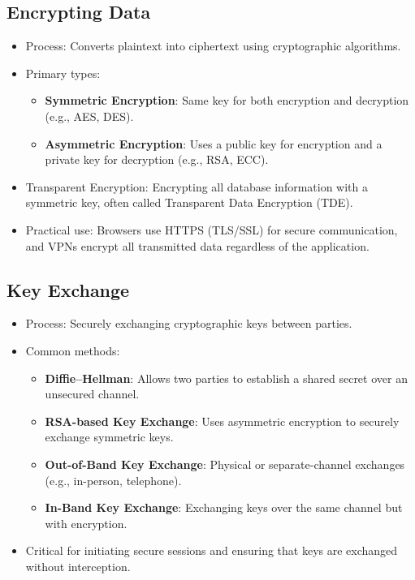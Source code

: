 \documentclass[11pt]{article}
\begin{document}
\subsection{Encrypting Data}
\label{sec:org29b72f5}
\begin{itemize}
\item Process: Converts plaintext into ciphertext using cryptographic algorithms.
\item Primary types:
\begin{itemize}
\item \textbf{Symmetric Encryption}: Same key for both encryption and decryption (e.g., AES, DES).
\item \textbf{Asymmetric Encryption}: Uses a public key for encryption and a private key for decryption (e.g., RSA, ECC).
\end{itemize}
\item Transparent Encryption: Encrypting all database information with a symmetric key, often called Transparent Data Encryption (TDE).
\item Practical use: Browsers use HTTPS (TLS/SSL) for secure communication, and VPNs encrypt all transmitted data regardless of the application.
\end{itemize}
\subsection{Key Exchange}
\label{sec:org9443067}
\begin{itemize}
\item Process: Securely exchanging cryptographic keys between parties.
\item Common methods:
\begin{itemize}
\item \textbf{Diffie–Hellman}: Allows two parties to establish a shared secret over an unsecured channel.
\item \textbf{RSA-based Key Exchange}: Uses asymmetric encryption to securely exchange symmetric keys.
\item \textbf{Out-of-Band Key Exchange}: Physical or separate-channel exchanges (e.g., in-person, telephone).
\item \textbf{In-Band Key Exchange}: Exchanging keys over the same channel but with encryption.
\end{itemize}
\item Critical for initiating secure sessions and ensuring that keys are exchanged without interception.
\end{itemize}
\end{document}
